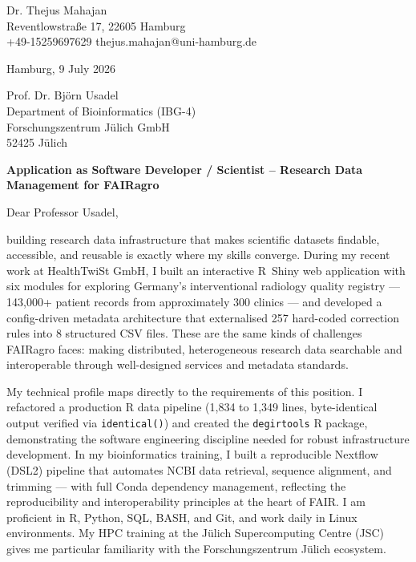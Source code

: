 \documentclass[10pt, a4paper]{article}
\begin{document}
\pagestyle{empty}

\begin{flushleft}
Dr. Thejus Mahajan\\
Reventlowstra{\ss}e 17, 22605 Hamburg\\
+49-15259697629 \hspace{0.3cm} thejus.mahajan@uni-hamburg.de
\end{flushleft}

\vspace{0.1cm}

\begin{flushright}
Hamburg, 9 July 2026
\end{flushright}

\vspace{0.1cm}

\begin{flushleft}
Prof. Dr. Bj\"orn Usadel\\
Department of Bioinformatics (IBG-4)\\
Forschungszentrum J\"ulich GmbH\\
52425 J\"ulich
\end{flushleft}

\vspace{0.1cm}

\textbf{Application as Software Developer / Scientist -- Research Data Management for FAIRagro}

\vspace{0.1cm}

Dear Professor Usadel,

building research data infrastructure that makes scientific datasets findable, accessible, and reusable is exactly where my skills converge. During my recent work at HealthTwiSt GmbH, I built an interactive R~Shiny web application with six modules for exploring Germany's interventional radiology quality registry --- 143,000+ patient records from approximately 300 clinics --- and developed a config-driven metadata architecture that externalised 257 hard-coded correction rules into 8 structured CSV files. These are the same kinds of challenges FAIRagro faces: making distributed, heterogeneous research data searchable and interoperable through well-designed services and metadata standards.

My technical profile maps directly to the requirements of this position. I refactored a production R data pipeline (1,834 to 1,349 lines, byte-identical output verified via \texttt{identical()}) and created the \texttt{degirtools} R package, demonstrating the software engineering discipline needed for robust infrastructure development. In my bioinformatics training, I built a reproducible Nextflow (DSL2) pipeline that automates NCBI data retrieval, sequence alignment, and trimming --- with full Conda dependency management, reflecting the reproducibility and interoperability principles at the heart of FAIR. I am proficient in R, Python, SQL, BASH, and Git, and work daily in Linux environments. My HPC training at the J\"ulich Supercomputing Centre (JSC) gives me particular familiarity with the Forschungszentrum J\"ulich ecosystem.
\end{document}
